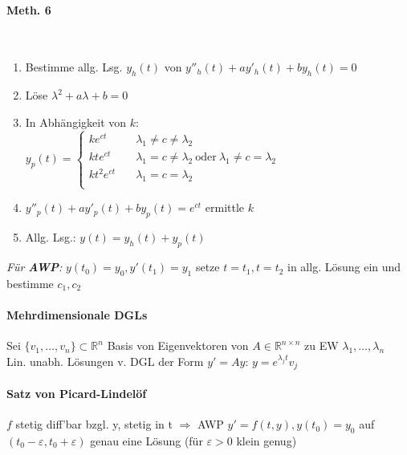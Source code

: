\documentclass[paper=a3,paper=landscape, fontsize=9pt, DIV=30]{scrartcl}
\newcommand{\real}{{\mathbb{R}}}
\begin{document}
\begin{multicols*}{4}
    \paragraph{Meth. 6}\hspace{0pt}\\
    \begin{enumerate}
    	\item Bestimme allg. Lsg. $y_h(t)$ von $y''_h(t)+ay'_h(t)+by_h(t)=0$
    \item Löse $\lambda^2+a\lambda+b=0$
    \item In Abhängigkeit von $k$:\\$y_p(t) =
    \begin{cases}
    ke^{ct}    & \quad \lambda_1 \neq c \neq \lambda_2 \\
    kte^{ct}   & \quad \lambda_1 = c \neq \lambda_2 \ \text{oder}\ \lambda_1 \neq c = \lambda_2 \\
    kt^2e^{ct} & \quad  \lambda_1 = c = \lambda_2 \\
    \end{cases}
    $
    \item $y''_p(t)+ay'_p(t)+by_p(t)=e^{ct}$
    ermittle $k$
    \item Allg. Lsg.: $y(t)=y_h(t)+y_p(t)$
    \end{enumerate}
	\textit{Für \textbf{AWP}:} $y(t_0)=y_0, y'(t_1)=y_1$ setze $t=t_1, t=t_2$ in allg. Lösung ein und bestimme $c_1,c_2$

  \paragraph{Mehrdimensionale DGLs}
  Sei $\{v_1, \dots, v_n\} \subset \real^n$ Basis von Eigenvektoren von $A \in \real^{n\times n}$ zu EW $\lambda_1, \dots, \lambda_n$\\
  Lin. unabh. Lösungen v. DGL der Form $y'=Ay$: $y=e^{\lambda_jt}v_j$

  \paragraph{Satz von Picard-Lindelöf}
  $f$ stetig diff'bar bzgl. y, stetig in t $\Rightarrow$ AWP $y'=f(t,y), y(t_0)=y_0$ auf $(t_0-\varepsilon, t_0+\varepsilon)$ genau eine Lösung (für $\varepsilon > 0$ klein genug)

\end{multicols*}
\end{document}
